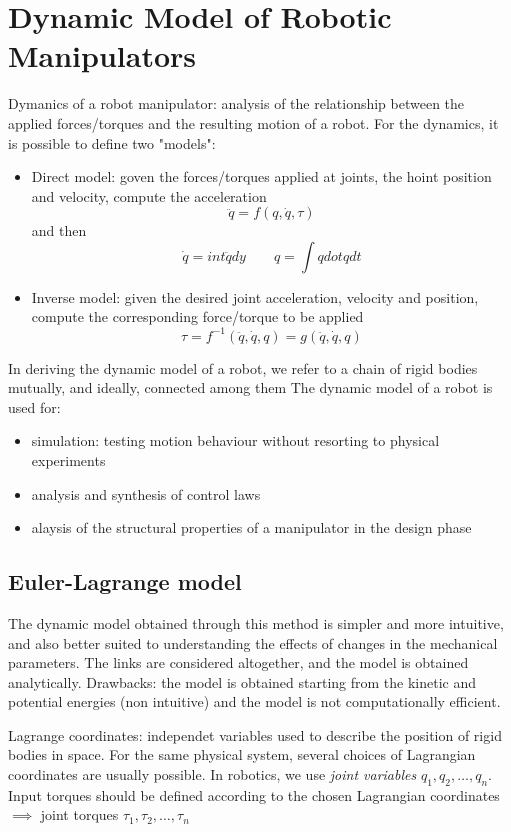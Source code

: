 \documentclass{book}
\begin{document}
\chapter{Dynamic Model of Robotic Manipulators}
Dymanics of a robot manipulator: analysis of the relationship between the applied forces/torques and the resulting motion of a robot. For the dynamics, it is possible to define two "models":
\begin{itemize}
    \item Direct model: goven the forces/torques applied at joints, the hoint position and velocity, compute the acceleration
        \[
            \ddot{q}=f(q,\dot{q},\tau)
        \]
        and then
        \[
            \dot{q}=int \ddot{q} dy \qquad q= \int qdot{q}dt
        \]
    \item Inverse model: given the desired joint acceleration, velocity and position, compute the corresponding force/torque to be applied
        \[
            \tau = f^{-1}(\ddot{q},\dot{q},q)=g(\ddot{q},\dot{q},q)
        \]
\end{itemize}
In deriving the dynamic model of a robot, we refer to a chain of rigid bodies mutually, and ideally, connected among them
The dynamic model of a robot is used for:
\begin{itemize}
    \item simulation: testing motion behaviour without resorting to physical experiments
    \item analysis and synthesis of control laws
    \item alaysis of the structural properties of a manipulator in the design phase
\end{itemize}



\section{Euler-Lagrange model}
The dynamic model obtained through this method is simpler and more intuitive, and also better suited to understanding the effects of changes in the mechanical parameters. The links are considered altogether, and the model is obtained analytically. Drawbacks: the model is obtained starting from the kinetic and potential energies (non intuitive) and the model is not computationally efficient.

Lagrange coordinates: independet variables used to describe the position of rigid bodies in space. For the same physical system, several choices of Lagrangian coordinates are usually possible. In robotics, we use \emph{joint variables} $q_1,q_2,\dots,q_n$. Input torques should be defined according to the chosen Lagrangian coordinates $\implies$ joint torques $\tau_1,\tau_2,\dots,\tau_n$ 
\end{document}
